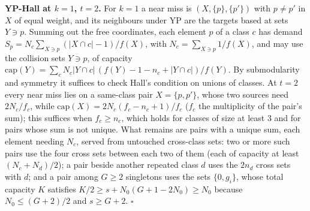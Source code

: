 \documentclass[11pt]{article}
\theoremstyle{plain}
\begin{document}
\textbf{YP-Hall at $k = 1$, $t = 2$.} For $k = 1$ a near miss is $(X, \{p\}, \{p'\})$ with $p \ne p'$ in $X$ of equal weight, and its neighbours under YP are the targets based at sets $Y \ni p$. Summing out the free coordinates, each element $p$ of a class $c$ has demand $S_p = N_c\sum_{X \ni p}(|X \cap c| - 1)/f(X)$, with $N_c = \sum_{X \ni p} 1/f(X)$, and may use the collision sets $Y \ni p$, of capacity $\mathrm{cap}(Y) = \sum_c N_c |Y \cap c|\,(f(Y) - 1 - n_c + |Y \cap c|)/f(Y)$. By submodularity and symmetry it suffices to check Hall's condition on unions of classes. At $t = 2$ every near miss lies on a same-class pair $X = \{p, p'\}$, whose two sources need $2N_c/f_c$, while $\mathrm{cap}(X) = 2N_c(f_c - n_c + 1)/f_c$ ($f_c$ the multiplicity of the pair's sum); this suffices when $f_c \ge n_c$, which holds for classes of size at least 3 and for pairs whose sum is not unique. What remains are pairs with a unique sum, each element needing $N_c$, served from untouched cross-class sets: two or more such pairs use the four cross sets between each two of them (each of capacity at least $(N_c + N_d)/2$); a pair beside another repeated class $d$ uses the $2n_d$ cross sets with $d$; and a pair among $G \ge 2$ singletons uses the sets $\{0, g_i\}$, whose total capacity $K$ satisfies $K/2 \ge s + N_0(G + 1 - 2N_0) \ge N_0$ because $N_0 \le (G+2)/2$ and $s \ge G + 2$. $\square$
\end{document}

